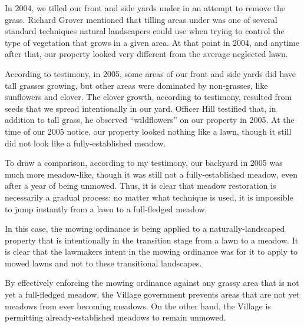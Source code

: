 \documentclass[12pt]{article}
\begin{document}
In 2004, we tilled our front and side yards under in an attempt to remove the grass.
Richard Grover mentioned that tilling areas under was one of several standard techniques natural landscapers could use when trying to control the type of vegetation that grows in a given area.
At that point in 2004, and anytime after that, our property looked very different from the average neglected lawn.

According to testimony, in 2005, some areas of our front and side yards did have tall grasses growing, but other areas were dominated by non-grasses, like sunflowers and clover.
The clover growth, according to testimony, resulted from seeds that we spread intentionally in our yard. 
Officer Hill testified that, in addition to tall grass, he observed ``wildflowers'' on our property in 2005.
At the time of our 2005 notice, our property looked nothing like a lawn, though it still did not look like a fully-established meadow.
  
To draw a comparison, according to my testimony, our backyard in 2005 was much more meadow-like, though it was still not a fully-established meadow, even after a year of being unmowed.
Thus, it is clear that meadow restoration is necessarily a gradual process:  no matter what technique is used, it is impossible to jump instantly from a lawn to a full-fledged meadow.

In this case, the mowing ordinance is being applied to a naturally-landscaped property that is intentionally in the transition stage from a lawn to a meadow.
It is clear that the lawmakers intent in the mowing ordinance was for it to apply to mowed lawns and not to these transitional landscapes.


By effectively enforcing the mowing ordinance against any grassy area that is not yet a full-fledged meadow, the Village government prevents areas that are not yet meadows from ever becoming meadows.
On the other hand, the Village is permitting already-established meadows to remain unmowed.
\end{document}
